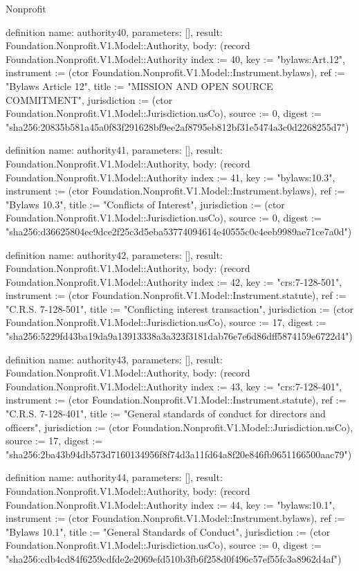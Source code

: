 \begin{lexlean}{Nonprofit}
\begin{semanticmodule}
definition{
  name: authority40,
  parameters: [],
  result: Foundation.Nonprofit.V1.Model::Authority,
  body: (record Foundation.Nonprofit.V1.Model::Authority {index := 40, key := "bylaws:Art.12", instrument := (ctor Foundation.Nonprofit.V1.Model::Instrument.bylaws), ref := "Bylaws Article 12", title := "MISSION AND OPEN SOURCE COMMITMENT", jurisdiction := (ctor Foundation.Nonprofit.V1.Model::Jurisdiction.usCo), source := 0, digest := "sha256:20835b581a45a0f83f291628bf9ee2af8795eb812bf31e5474a3c0d2268255d7"})
}

definition{
  name: authority41,
  parameters: [],
  result: Foundation.Nonprofit.V1.Model::Authority,
  body: (record Foundation.Nonprofit.V1.Model::Authority {index := 41, key := "bylaws:10.3", instrument := (ctor Foundation.Nonprofit.V1.Model::Instrument.bylaws), ref := "Bylaws 10.3", title := "Conflicts of Interest", jurisdiction := (ctor Foundation.Nonprofit.V1.Model::Jurisdiction.usCo), source := 0, digest := "sha256:d36625804ec9dce2f25c3d5eba53774094614e40555c0c4eeb9989ae71ce7a0d"})
}

definition{
  name: authority42,
  parameters: [],
  result: Foundation.Nonprofit.V1.Model::Authority,
  body: (record Foundation.Nonprofit.V1.Model::Authority {index := 42, key := "crs:7-128-501", instrument := (ctor Foundation.Nonprofit.V1.Model::Instrument.statute), ref := "C.R.S. 7-128-501", title := "Conflicting interest transaction", jurisdiction := (ctor Foundation.Nonprofit.V1.Model::Jurisdiction.usCo), source := 17, digest := "sha256:5229fd43ba19da9a13913338a3a323f3181dab76e7e6d86dff5874159e6722d4"})
}

definition{
  name: authority43,
  parameters: [],
  result: Foundation.Nonprofit.V1.Model::Authority,
  body: (record Foundation.Nonprofit.V1.Model::Authority {index := 43, key := "crs:7-128-401", instrument := (ctor Foundation.Nonprofit.V1.Model::Instrument.statute), ref := "C.R.S. 7-128-401", title := "General standards of conduct for directors and officers", jurisdiction := (ctor Foundation.Nonprofit.V1.Model::Jurisdiction.usCo), source := 17, digest := "sha256:2ba43b94db573d7160134956f8f74d3a11fd64a8f20e846fb9651166500aac79"})
}

definition{
  name: authority44,
  parameters: [],
  result: Foundation.Nonprofit.V1.Model::Authority,
  body: (record Foundation.Nonprofit.V1.Model::Authority {index := 44, key := "bylaws:10.1", instrument := (ctor Foundation.Nonprofit.V1.Model::Instrument.bylaws), ref := "Bylaws 10.1", title := "General Standards of Conduct", jurisdiction := (ctor Foundation.Nonprofit.V1.Model::Jurisdiction.usCo), source := 0, digest := "sha256:cdb4cd84f6259cdfde2e2069efd510b3fb6f258d0f496c57ef55fc3a8962d4af"})
}


\end{semanticmodule}
\end{lexlean}
